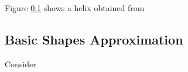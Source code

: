 \documentclass[a4paper,10pt]{article}
\begin{document}
 
 
 
 Figure \ref{} shows a helix obtained from \subsection{Basic Shapes Approximation}
 Consider
 
 



   
   
  





 
 
 

 
 
\end{document}
